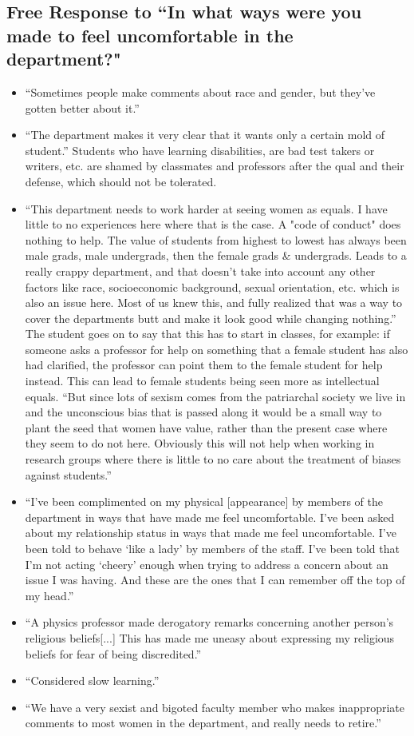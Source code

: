 \documentclass[oneside]{book}   %
\begin{document}
\subsection{Free Response to ``In what ways were you made to feel uncomfortable in the department?"}
\label{subsec:uncomfortable}
\begin{itemize}
	\item “Sometimes people make comments about race and gender, but they've gotten better about it.”
	\item “The department makes it very clear that it wants only a certain mold of student.” Students who have learning disabilities, are bad test takers or writers, etc. are shamed by classmates and professors after the qual and their defense, which should not be tolerated.
	\item “This department needs to work harder at seeing women as equals. I have little to no experiences here where that is the case. A "code of conduct" does nothing to help. The value of students from highest to lowest has always been male grads, male undergrads, then the female grads \& undergrads. Leads to a really crappy department, and that doesn't take into account any other factors like race, socioeconomic background, sexual orientation, etc. which is also an issue here. Most of us knew this, and fully realized that 	was a way to cover the departments butt and make it look good while changing nothing.” The student goes on to say that this has to start in classes, for example: if someone asks a professor for help on something that a female student has also had clarified, the professor can point them to the female student for help instead. This can lead to female students being seen more as intellectual equals. “But since lots of sexism comes from the patriarchal society we live in and the unconscious bias that is passed along it would be a small way to plant the seed that women have value, rather than the present case where they seem to do not here. Obviously this will not help when working in research groups where there is little to no care about the treatment of biases against students.”
	\item “I've been complimented on my physical [appearance] by members of the department in 	ways that have made me feel uncomfortable. I've been asked about my relationship status in ways that made me feel uncomfortable. I've been told to behave ‘like a lady’ by members of the staff. I've been told that I'm not acting ‘cheery’ enough when trying to address a concern about an issue I was having. And these are the ones that I can remember off the top of my head.”
	\item “A physics professor made derogatory remarks concerning another person's religious beliefs[...] This has made me uneasy about expressing my religious beliefs for fear of being discredited.”
	\item “Considered slow learning.”
	\item “We have a very sexist and bigoted faculty member who makes inappropriate comments to most women in the department, and really needs to retire.”
\end{itemize}
\end{document}
